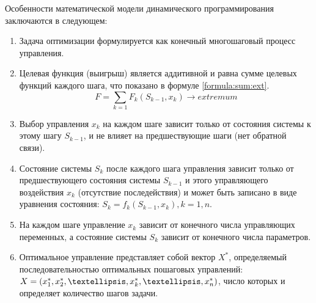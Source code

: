 Особенности математической модели динамического программирования заключаются в следующем:
\begin{enumerate}
	\item Задача оптимизации формулируется как конечный многошаговый процесс управления.
	\item Целевая функция (выигрыш) является аддитивной и равна сумме целевых функций каждого шага, что показано в формуле \ref{formula:sum:ext}.
		\begin{equation}
		\label{formula:sum:ext}
		F = \sum_{k=1}{F_k(S_{k-1},x_k)} \rightarrow extremum
		\end{equation}
	\item Выбор управления $x_k$ на каждом шаге зависит только от состояния системы к этому шагу $S_{k-1}$, и не влияет на предшествующие шаги (нет обратной связи).
	\item Состояние системы $S_k$ после каждого шага управления зависит только от предшествующего состояния системы $S_{k-1}$ и этого управляющего воздействия $x_k$ (отсутствие последействия) и может быть записано в виде уравнения состояния: $S_k = f_k (S_{k-1}, x_k), k = 1, n$.
	\item На каждом шаге управление $x_k$ зависит от конечного числа управляющих переменных, а состояние системы $S_k$ зависит от конечного числа параметров.
	\item Оптимальное управление представляет собой вектор $X^*$, определяемый последовательностью оптимальных пошаговых управлений: $X = (x^*_1, x^*_2, \textellipsis, x^*_k, \textellipsis, x^*_n)$, число которых и определяет количество шагов задачи.
\end{enumerate}